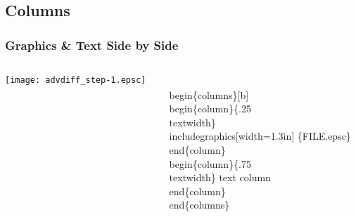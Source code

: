 \documentclass{article}
\begin{document}
\subsection{Columns}
\begin{frame}[fragile]
\frametitle{Graphics \& Text  Side by Side}
\begin{columns}[b]
  \begin{column}{.25\textwidth}
       \texttt{[image: advdiff\_step-1.epsc]}
  \end{column}
    \begin{column}{.75\textwidth}
    \begin{semiverbatim}
 \alert<1>{\\begin\{columns\}[b]}
  \alert<2>{\\begin\{column\}\{.25\\textwidth\}}
        \alert<3>{\\includegraphics[width=1.3in]%
             \{FILE.epsc\}}
  \alert<2>{\\end\{column\}}
   \alert<4>{\\begin\{column\}\{.75\\textwidth\}}
        \alert<5>{text column}
   \alert<4>{\\end\{column\}}
 \alert<1>{\\end\{columns\}}
    \end{semiverbatim}
      \end{column}
\end{columns}
\end{frame} 
\end{document}
